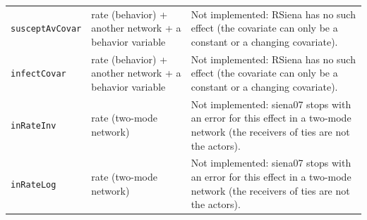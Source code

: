 \begin{longtable}{@{}p{2.8cm}p{4.6cm}p{6.5cm}@{}}
\texttt{susceptAvCovar} & rate (behavior) + another network + a behavior variable & Not implemented: RSiena has no such effect (the covariate can only be a constant or a changing covariate).\\
\texttt{infectCovar} & rate (behavior) + another network + a behavior variable & Not implemented: RSiena has no such effect (the covariate can only be a constant or a changing covariate).\\
\texttt{inRateInv} & rate (two-mode network) & Not implemented: siena07 stops with an error for this effect in a two-mode network (the receivers of ties are not the actors).\\
\texttt{inRateLog} & rate (two-mode network) & Not implemented: siena07 stops with an error for this effect in a two-mode network (the receivers of ties are not the actors).\\
\bottomrule
\end{longtable}
\normalsize

